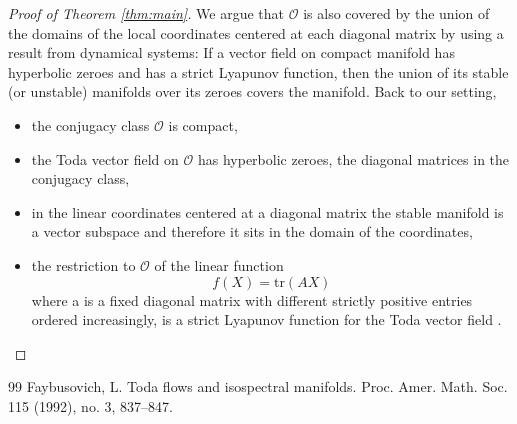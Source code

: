 \documentclass[10pt,a4paper]{amsart}
\newcommand{\cO}{\mathcal{O}}
\begin{document}
\begin{proof}[Proof of Theorem \ref{thm:main}]
We argue that
$\cO$ is also covered by the union of the domains of the local coordinates centered at each diagonal matrix by using a result from dynamical systems: If a vector field on compact manifold has hyperbolic zeroes and has a strict Lyapunov function, then the union of its stable (or unstable) manifolds over its zeroes covers the manifold. Back to our setting,
\begin{itemize}
 \item the conjugacy class $\cO$ is compact,
 \item the Toda vector field on $\cO$ has hyperbolic zeroes, the diagonal matrices in the conjugacy class,
 \item  in the linear coordinates centered at a diagonal matrix  the stable manifold is a vector subspace and therefore it sits in the domain of the coordinates,
 \item the restriction to $\cO$ of the linear function
 \[f(X)=\mathrm{tr}(AX)\]
 where a is a fixed diagonal matrix with different strictly positive entries ordered increasingly, is a strict Lyapunov function for the Toda vector field  \cite[Lemma 1]{Fa}.
\end{itemize}
\end{proof}

\begin{thebibliography}{99}
 Faybusovich, L. Toda flows and isospectral manifolds. Proc. Amer. Math. Soc. 115 (1992), no. 3, 837--847.
\end{thebibliography}
\end{document}
